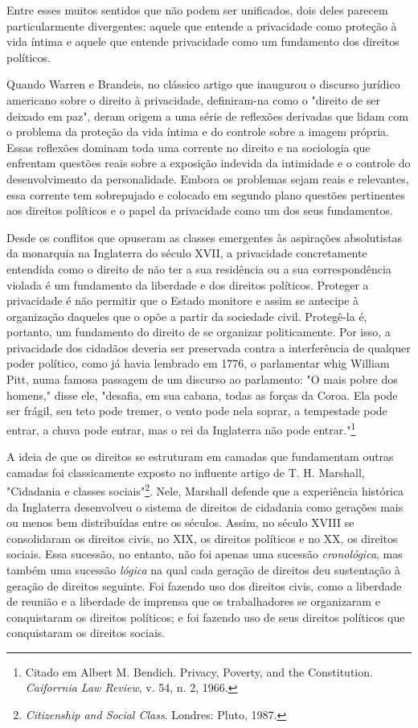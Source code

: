 Entre esses muitos sentidos que não podem ser unificados, dois deles
parecem particularmente divergentes: aquele que entende a privacidade
como proteção à vida íntima e aquele que entende privacidade como um
fundamento dos direitos políticos.

Quando Warren e Brandeis, no clássico artigo que inaugurou o discurso
jurídico americano sobre o direito à privacidade, definiram-na como o
"direito de ser deixado em paz", deram origem a uma série de reflexões
derivadas que lidam com o problema da proteção da vida íntima e do
controle sobre a imagem própria. Essas reflexões dominam toda uma
corrente no direito e na sociologia que enfrentam questões reais sobre a
exposição indevida da intimidade e o controle do desenvolvimento da
personalidade. Embora os problemas sejam reais e relevantes, essa
corrente tem sobrepujado e colocado em segundo plano questões
pertinentes aos direitos políticos e o papel da privacidade como um dos
seus fundamentos.

Desde os conflitos que opuseram as classes emergentes às aspirações
absolutistas da monarquia na Inglaterra do século XVII, a privacidade
concretamente entendida como o direito de não ter a sua residência ou a
sua correspondência violada é um fundamento da liberdade e dos direitos
políticos. Proteger a privacidade é não permitir que o Estado monitore e
assim se antecipe à organização daqueles que o opõe a partir da
sociedade civil. Protegê-la é, portanto, um fundamento do direito de se
organizar politicamente. Por isso, a privacidade dos cidadãos deveria
ser preservada contra a interferência de qualquer poder político, como
já havia lembrado em 1776, o parlamentar whig William Pitt, numa famosa
passagem de um discurso ao parlamento: "O mais pobre dos homens," disse
ele, "desafia, em sua cabana, todas as forças da Coroa. Ela pode ser
frágil, seu teto pode tremer, o vento pode nela soprar, a tempestade
pode entrar, a chuva pode entrar, mas o rei da Inglaterra não pode
entrar."\footnote{Citado em Albert M. Bendich. Privacy,
  Poverty, and the Constitution. \emph{Caiforrnia Law Review}, v. 54, n.
  2, 1966. }

A ideia de que os direitos se estruturam em camadas que fundamentam
outras camadas foi classicamente exposto no influente artigo de T. H.
Marshall, "Cidadania e classes sociais"\footnote{\emph{Citizenship
  and Social Class}. Londres: Pluto, 1987.}. Nele, Marshall defende que
a experiência histórica da Inglaterra desenvolveu o sistema de direitos
de cidadania como gerações mais ou menos bem distribuídas entre os
séculos. Assim, no século XVIII se consolidaram os direitos civis, no
XIX, os direitos políticos e no XX, os direitos sociais. Essa sucessão,
no entanto, não foi apenas uma sucessão \emph{cronológica}, mas também
uma sucessão \emph{lógica} na qual cada geração de direitos deu
sustentação à geração de direitos seguinte. Foi fazendo uso dos direitos
civis, como a liberdade de reunião e a liberdade de imprensa que os
trabalhadores se organizaram e conquistaram os direitos políticos; e foi
fazendo uso de seus direitos políticos que conquistaram os direitos
sociais.

